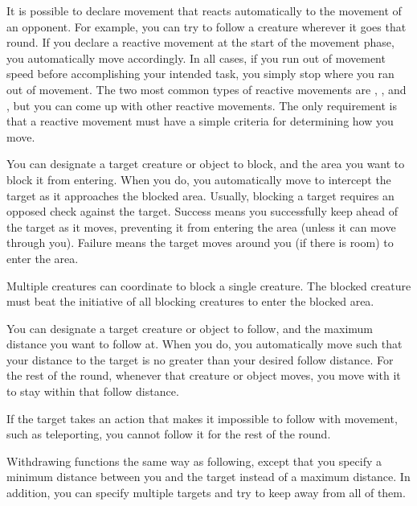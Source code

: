             It is possible to declare movement that reacts automatically to the movement of an opponent.
            For example, you can try to follow a creature wherever it goes that round.
            If you declare a reactive movement at the start of the movement phase, you automatically move accordingly.
            In all cases, if you run out of movement speed before accomplishing your intended task, you simply stop where you ran out of movement.
            The two most common types of reactive movements are , , and , but you can come up with other reactive movements.
            The only requirement is that a reactive movement must have a simple criteria for determining how you move.

            \label{Blocking} You can designate a target creature or object to block, and the area you want to block it from entering.
            When you do, you automatically move to intercept the target as it approaches the blocked area.
            Usually, blocking a target requires an opposed  check against the target.
            Success means you successfully keep ahead of the target as it moves, preventing it from entering the area (unless it can move through you).
            Failure means the target moves around you (if there is room) to enter the area.

            Multiple creatures can coordinate to block a single creature.
            The blocked creature must beat the initiative of all blocking creatures to enter the blocked area.

            \label{Following} You can designate a target creature or object to follow, and the maximum distance you want to follow at. When you do, you automatically move such that your distance to the target is no greater than your desired follow distance. For the rest of the round, whenever that creature or object moves, you move with it to stay within that follow distance.

            If the target takes an action that makes it impossible to follow with movement, such as teleporting, you cannot follow it for the rest of the round.

            \label{Withdrawing} Withdrawing functions the same way as following, except that you specify a minimum distance between you and the target instead of a maximum distance.
            In addition, you can specify multiple targets and try to keep away from all of them.

